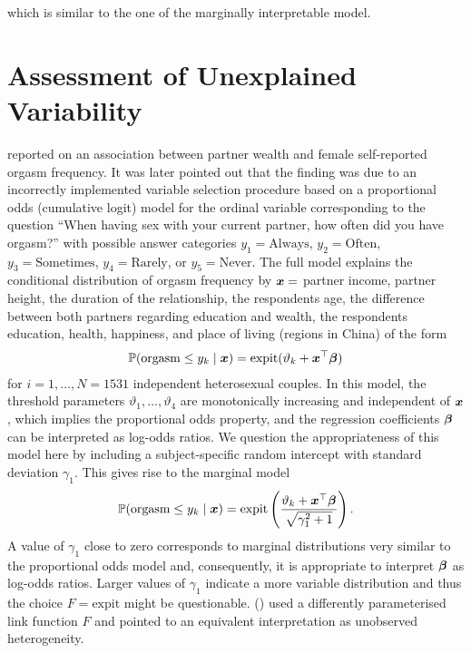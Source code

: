 \documentclass[article,nojss,shortnames]{jss}\usepackage[]{graphicx}\usepackage[]{xcolor}
\newcommand{\THcite}[2]{\citeauthor{#2} (\citeyear{#2})}
\newcommand{\expit}{\text{expit}}
\newcommand{\ry}{y}
\newcommand{\rx}{\xvec}
\newcommand{\pZ}{F}
\newcommand{\eparm}{\vartheta}
\newcommand{\shiftparm}{\betavec}
\renewcommand{\Prob}{\mathbb{P}}
\def \xvec {\text{\boldmath$x$}}    \def \mX {\text{\boldmath$X$}}
\def \betavec         {\text{\boldmath$\beta$}}
\begin{document}
which is similar to the one of the marginally interpretable model.









\section{Assessment of Unexplained Variability}



\cite{Pollet2009} reported on an association between partner wealth and
female self-reported orgasm frequency.  It was later
pointed out \citep{Herberich+Hothorn+Nettle+Pollet2010} that the finding was
due to an incorrectly implemented variable selection procedure based on a
proportional odds (cumulative logit) model for the ordinal variable
corresponding to the question ``When having sex with your current partner,
how often did you have orgasm?'' with possible answer categories $\ry_1 =
\text{Always}$, $\ry_2 = \text{Often}$, $\ry_3 = \text{Sometimes}$, $\ry_4 =
\text{Rarely}$, or $\ry_5 = \text{Never}$.  The full model explains the
conditional distribution of orgasm frequency by $\rx = $ partner income,
partner height, the duration of the relationship, the respondents age, the
difference between both partners regarding education and wealth, the
respondents education, health, happiness, and place of living (regions in
China) of the form
%
\begin{eqnarray*}
\Prob(\text{orgasm} \le \ry_k \mid \rx) = \expit(\eparm_k + 
                                                       \rx^\top \shiftparm)
\end{eqnarray*}
%
for $i = 1, \dots, N = 1531$ independent heterosexual 
couples. In this model, the threshold parameters $\eparm_1,
\dots, \eparm_4$ are monotonically increasing and independent of $\rx$,
which implies the proportional odds property, and the regression coefficients 
$\shiftparm$ can be interpreted as log-odds ratios. We question the appropriateness of this
model here by including a subject-specific random intercept with standard
deviation $\gamma_1$. This gives rise to the marginal model
\begin{eqnarray*}
\Prob(\text{orgasm} \le \ry_k \mid \rx) = \expit \left(
\frac{\eparm_k + \rx^\top
  \shiftparm}{\sqrt{\gamma_1^2 + 1}} \right).
\end{eqnarray*}
A value of $\gamma_1$ close to zero corresponds to marginal distributions
very similar to the proportional odds model and, consequently, it is
appropriate to interpret $\shiftparm$ as log-odds ratios. Larger values of
$\gamma_1$ indicate a more variable distribution and thus the choice $\pZ =
\expit$ might be questionable.
\THcite{McLain and Ghosh}{McLain_Ghosh_2013} used a
differently parameterised link function $\pZ$ and pointed to an equivalent
interpretation as unobserved heterogeneity. 
\end{document}
